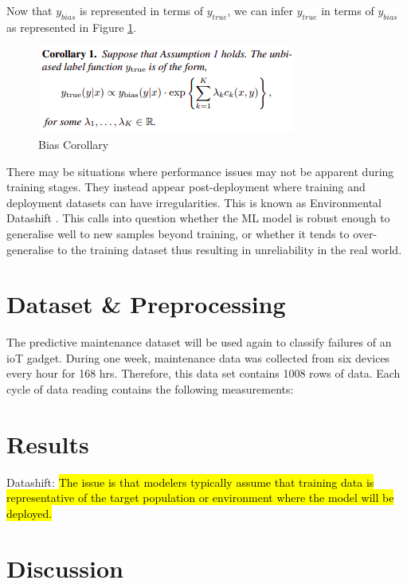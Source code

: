 \documentclass[a4paper,12pt]{report}
\begin{document}
Now that $y_{bias}$ is represented in terms of $y_{true}$, we can infer $y_{true}$ in terms of $y_{bias}$ as represented in Figure \ref{fig:Corollary}.

\begin{figure}[h]
    \includegraphics[scale =0.8]{corollary.png}
    \centering
    \caption{Bias Corollary \cite{Jiang}}
    \label{fig:Corollary}
\end{figure}

There may be situations where performance issues may not be apparent during training stages. 
They instead appear post-deployment where training and deployment datasets can have irregularities. 
This is known as Environmental Datashift \cite{saria2019tutorial}. 
This calls into question whether the ML model is robust enough to generalise well to new samples beyond training, or whether it tends to over-generalise to the training dataset thus resulting in unreliability in the real world.


\section{Dataset \& Preprocessing}
The predictive maintenance dataset will be used again to classify failures of an ioT gadget.
During one week, maintenance data was collected from six devices every hour for 168 hrs.
Therefore, this data set contains 1008 rows of data. 
Each cycle of data reading contains the following measurements: 

\section{Results}
Datashift:
\hl{The issue is that modelers typically assume that training data
is representative of the target population or environment where
the model will be deployed. }\cite{saria2019tutorial}

\section{Discussion}

\end{document}
